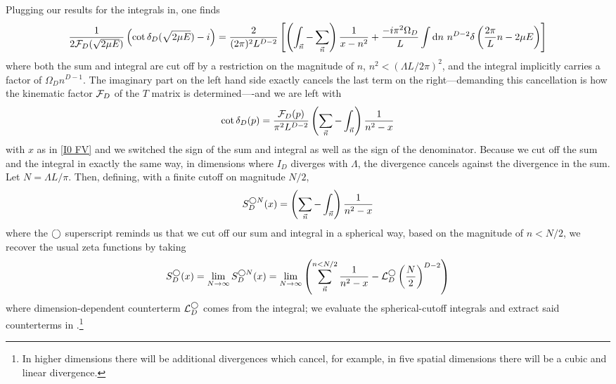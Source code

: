 Plugging our results for the integrals in, one finds
\begin{equation}
    \frac{1}{2\mathcal{F}_{D}(\sqrt{2\mu E})}\left(\cot \delta_{D}(\sqrt{2\mu E}) - i\right) = \frac{2}{(2\pi)^2 L^{D-2}}\left[ \left(\int_{\vec{n}} - \sum_{\vec{n}}\right) \frac{1}{x-n^2} + \frac{-i \pi^2\Omega_D}{L} \int \mathrm{d}n\ n^{D-2} \delta\left(\frac{2\pi}{L}n - 2\mu E\right) \right]
\end{equation}
where both the sum and integral are cut off by a restriction on the magnitude of $n$, $n^2 < (\Lambda L / 2\pi)^2$, and the integral implicitly carries a factor of $\Omega_D n^{D-1}$.
The imaginary part on the left hand side exactly cancels the last term on the right---demanding this cancellation is how the kinematic factor $\mathcal{F}_D$ of the $T$ matrix is determined----and we are left with
\begin{equation}\label{eq:general luscher}
    \cot \delta_{D}(p) = \frac{\mathcal{F}_{D}(p)}{\pi^2 L^{D-2}} \left(\sum_{\vec{n}}-\int_{\vec{n}}\right) \frac{1}{n^2-x}
\end{equation}
with $x$ as in \eqref{I0 FV} and we switched the sign of the sum and integral as well as the sign of the denominator.
Because we cut off the sum and the integral in exactly the same way, in dimensions where $I_D$ diverges with $\Lambda$, the divergence cancels against the divergence in the sum.
Let $N=\Lambda L/\pi$.
Then, defining, with a finite cutoff on magnitude $N/2$,
\begin{equation}\label{eq:spherical cutoff S}
    S^{\bigcirc N}_D(x) = \left(\sum_{\vec{n}}- \int_{\vec{n}}\right) \frac{1}{n^2-x}
\end{equation}
where the $\bigcirc$ superscript reminds us that we cut off our sum and integral in a spherical way, based on the magnitude of $n<N/2$, we recover the usual \Luscher zeta functions by taking
\begin{equation}\label{eq:spherical S}
    S^\bigcirc_D(x)
    =
    \lim_{N\rightarrow\infty} S^{\bigcirc N}_D(x)
    =
    \lim_{N\rightarrow\infty}\left( \sum_{\vec{n}}^{n < N/2} \frac{1}{n^2-x} - \mathcal{L}_D^\bigcirc \left(\frac{N}{2}\right)^{D-2}\right)
\end{equation}
where dimension-dependent counterterm $\mathcal{L}_D^\bigcirc$ comes from the integral; we evaluate the spherical-cutoff integrals and extract said counterterms in .\footnote{
In higher dimensions there will be additional divergences which cancel, for example, in five spatial dimensions there will be a cubic and linear divergence.
}
